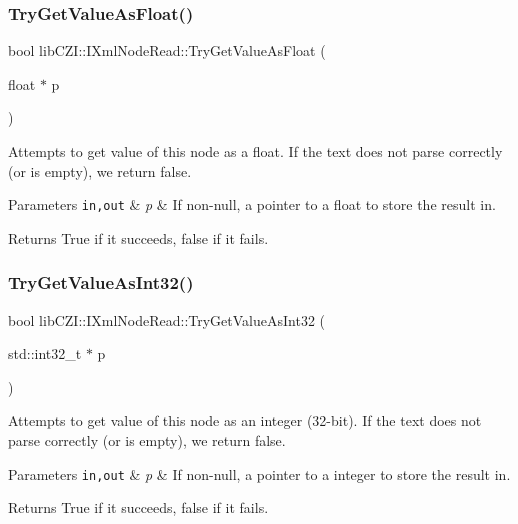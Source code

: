 \subsubsection{\texorpdfstring{Try\+Get\+Value\+As\+Float()}{TryGetValueAsFloat()}}
{\footnotesize\ttfamily bool lib\+C\+Z\+I\+::\+I\+Xml\+Node\+Read\+::\+Try\+Get\+Value\+As\+Float (\begin{DoxyParamCaption}\item[{float $\ast$}]{p }\end{DoxyParamCaption})}

Attempts to get value of this node as a float. If the text does not parse correctly (or is empty), we return false. 
\begin{DoxyParams}[1]{Parameters}
\mbox{\tt in,out}  & {\em p} & If non-\/null, a pointer to a float to store the result in. \\
\hline
\end{DoxyParams}
\begin{DoxyReturn}{Returns}
True if it succeeds, false if it fails. 
\end{DoxyReturn}
\mbox{\label{classlib_c_z_i_1_1_i_xml_node_read_ad03686b294d2271dfa1a44c88c0751bc}} 
\subsubsection{\texorpdfstring{Try\+Get\+Value\+As\+Int32()}{TryGetValueAsInt32()}}
{\footnotesize\ttfamily bool lib\+C\+Z\+I\+::\+I\+Xml\+Node\+Read\+::\+Try\+Get\+Value\+As\+Int32 (\begin{DoxyParamCaption}\item[{std\+::int32\+\_\+t $\ast$}]{p }\end{DoxyParamCaption})}

Attempts to get value of this node as an integer (32-\/bit). If the text does not parse correctly (or is empty), we return false. 
\begin{DoxyParams}[1]{Parameters}
\mbox{\tt in,out}  & {\em p} & If non-\/null, a pointer to a integer to store the result in. \\
\hline
\end{DoxyParams}
\begin{DoxyReturn}{Returns}
True if it succeeds, false if it fails. 
\end{DoxyReturn}
\mbox{\label{classlib_c_z_i_1_1_i_xml_node_read_adbf74c7628e88a54791b315c12b176bf}} 

